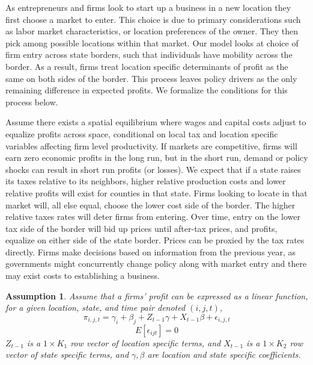 \documentclass[12pt,a4paper]{article}
\newtheorem{assumption}[theorem]{Assumption}
\begin{document}
As entrepreneurs and firms look to start up a business in a new location they first choose a market to enter. This choice is due to primary considerations such as labor market characteristics, or location preferences of the owner. They then pick among possible locations within that market. Our model looks at choice of firm entry across state borders, such that individuals have mobility across the border. As a result, firms treat location specific determinants of profit as the same on both sides of the border. This process leaves policy drivers as the only remaining difference in expected profits. We formalize the conditions for this process below. 

Assume there exists a spatial equilibrium where wages and capital costs adjust to equalize profits across space, conditional on local tax and location specific variables affecting firm level productivity. If markets are competitive, firms will earn zero economic profits in the long run, but in the short run, demand or policy shocks can result in short run profits (or losses). We expect that if a state raises its taxes relative to its neighbors, higher relative production costs and lower  relative profits will exist for counties in that state.  Firms looking to locate in that market will, all else equal, choose the lower cost side of the border.  The higher relative taxes rates will  deter firms from entering. Over time,  entry on the lower tax side of the border will bid up prices until after-tax prices, and profits, equalize on either side of the state border. Prices can be proxied by the tax rates directly. Firms make decisions based on information from the previous year, as governments might concurrently change policy along with market entry and there may exist costs to establishing a business.

\begin{assumption}
Assume that a firms' profit can be expressed as a linear function, for a given location, state, and time pair denoted $(i,j,t)$,
\begin{equation}
\pi_{i,j,t} =  \gamma_{i}+\beta_{j}+Z_{t-1}\gamma+X_{t-1}\beta+\epsilon_{i,j,t}
\end{equation}
\begin{equation}
E[\epsilon_{ijt}] = 0
\end{equation}
$Z_{t-1}$ is a $1 \times K_{1}$ row vector of location specific terms, and $X_{t-1}$ is a $1 \times K_{2}$ row vector of state specific terms, and $\gamma, \beta$ are location and state specific coefficients.
\end{assumption}
\end{document}
